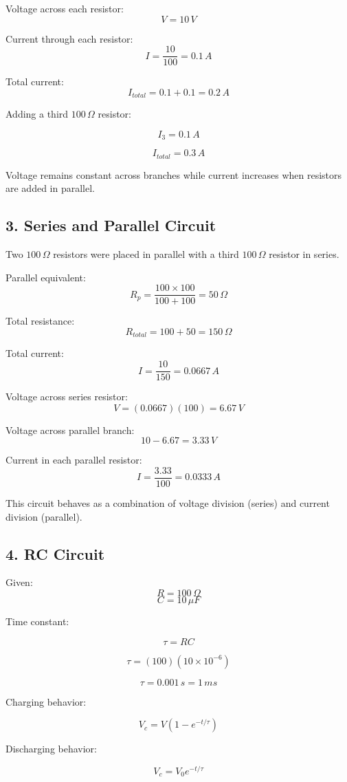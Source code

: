 \documentclass[11pt]{article}
\begin{document}
Voltage across each resistor:
\[
V = 10\,V
\]

Current through each resistor:
\[
I = \frac{10}{100} = 0.1\,A
\]

Total current:
\[
I_{total} = 0.1 + 0.1 = 0.2\,A
\]

Adding a third $100\,\Omega$ resistor:

\[
I_3 = 0.1\,A
\]

\[
I_{total} = 0.3\,A
\]

Voltage remains constant across branches while current increases when resistors are added in parallel.

\subsection*{3. Series and Parallel Circuit}

Two $100\,\Omega$ resistors were placed in parallel with a third $100\,\Omega$ resistor in series.

Parallel equivalent:
\[
R_p = \frac{100 \times 100}{100 + 100} = 50\,\Omega
\]

Total resistance:
\[
R_{total} = 100 + 50 = 150\,\Omega
\]

Total current:
\[
I = \frac{10}{150} = 0.0667\,A
\]

Voltage across series resistor:
\[
V = (0.0667)(100) = 6.67\,V
\]

Voltage across parallel branch:
\[
10 - 6.67 = 3.33\,V
\]

Current in each parallel resistor:
\[
I = \frac{3.33}{100} = 0.0333\,A
\]

This circuit behaves as a combination of voltage division (series) and current division (parallel).

\subsection*{4. RC Circuit}

Given:
\[
R = 100\,\Omega
\]
\[
C = 10\,\mu F
\]

Time constant:

\[
\tau = RC
\]

\[
\tau = (100)(10\times10^{-6})
\]

\[
\tau = 0.001\,s = 1\,ms
\]

Charging behavior:

\[
V_c = V(1-e^{-t/\tau})
\]

Discharging behavior:

\[
V_c = V_0 e^{-t/\tau}
\]
\end{document}
